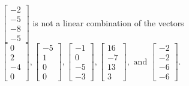 \begin{exercise}
\begin{exerciseStatement}
  \end{exerciseStatement}
  \begin{exerciseAnswer}
   \(\left[\begin{array}{c}
-2 \\
-5 \\
-8 \\
-5
\end{array}\right]\) 
  	 is not  
	a linear combination of the vectors \(\left[\begin{array}{c}
0 \\
2 \\
-4 \\
0
\end{array}\right] , \left[\begin{array}{c}
-5 \\
1 \\
0 \\
0
\end{array}\right] , \left[\begin{array}{c}
-1 \\
0 \\
-5 \\
-3
\end{array}\right] , \left[\begin{array}{c}
16 \\
-7 \\
13 \\
3
\end{array}\right] , \text{ and } \left[\begin{array}{c}
-2 \\
-2 \\
-6 \\
-6
\end{array}\right]\).

	
  


  \end{exerciseAnswer}
\end{exercise}